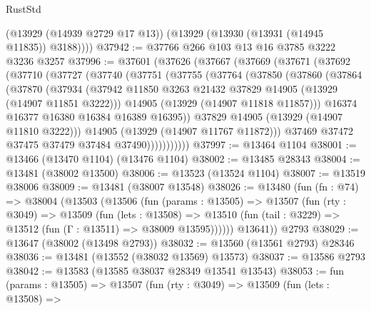 \begin{lexlean}{RustStd}
\begin{coremodule}
        (@13929 (@14939 @2729 @17 @13))
        (@13929 (@13930 (@13931 (@14945 @11835)) @3188))))
@37942 := @37766 @266 @103 @13 @16 @3785 @3222 @3236 @3257
@37996 := @37601
    (@37626
      (@37667
        (@37669
          (@37671
            (@37692
              (@37710
                (@37727
                  (@37740
                    (@37751
                      (@37755
                        (@37764
                          (@37850
                            (@37860
                              (@37864
                                (@37870
                                  (@37934
                                    (@37942
                                      @11850
                                      @3263
                                      @21432
                                      @37829
                                      @14905
                                      (@13929 (@14907 @11851 @3222)))
                                    @14905
                                    (@13929 (@14907 @11818 @11857)))
                                  @16374
                                  @16377
                                  @16380
                                  @16384
                                  @16389
                                  @16395))
                              @37829
                              @14905
                              (@13929 (@14907 @11810 @3222)))
                            @14905
                            (@13929 (@14907 @11767 @11872)))
                          @37469
                          @37472
                          @37475
                          @37479
                          @37484
                          @37490)))))))))))
@37997 := @13464 @1104
@38001 := @13466 (@13470 @1104) (@13476 @1104)
@38002 := @13485 @28343
@38004 := @13481 (@38002 @13500)
@38006 := @13523 (@13524 @1104)
@38007 := @13519 @38006
@38009 := @13481 (@38007 @13548)
@38026 := @13480
    (fun (fn : @74) =>
    @38004
      (@13503
        (@13506
          (fun (params : @13505) =>
          @13507
            (fun (rty : @3049) =>
            @13509
              (fun (lets : @13508) =>
              @13510 (fun (tail : @3229) => @13512 (fun (Γ : @13511) => @38009 @13595))))))
        @13641))
    @2793
@38029 := @13647 (@38002 (@13498 @2793))
@38032 := @13560 (@13561 @2793) @28346
@38036 := @13481 (@13552 (@38032 @13569) @13573)
@38037 := @13586 @2793
@38042 := @13583 (@13585 @38037 @28349 @13541 @13543)
@38053 := fun (params : @13505) =>
  @13507
    (fun (rty : @3049) =>
    @13509
      (fun (lets : @13508) =>

\end{coremodule}
\end{lexlean}
